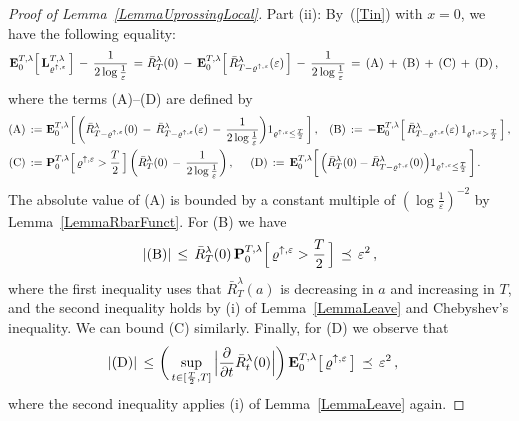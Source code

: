 \documentclass[10pt]{article}
\numberwithin{equation}{section}
\theoremstyle{definition}
\begin{document}
\begin{proof}[Proof of Lemma~\ref{LemmaUprossingLocal}]
\noindent Part (ii): By~(\ref{Tin}) with $x=0$, we have the following equality:
\begin{align*}
 \mathbf{E}^{T,\lambda}_{0}\Big[\,\mathbf{L}^{T,\lambda}_{\varrho^{\uparrow, \varepsilon} }\,\Big] \,-\,\frac{ 1 }{2\log \frac{1}{\varepsilon} }     \,=\,  &\,\bar{R}_{T}^{\lambda}(0) \,-\, \mathbf{E}^{T,\lambda}_{0}\Big[\,\bar{R}_{T-\varrho^{\uparrow,\varepsilon}}^{ \lambda}(\varepsilon)\,\Big]\,-\,\frac{ 1 }{2\log \frac{1}{\varepsilon} }\,=\,\textup{(A)}\,+\, \textup{(B)} \,+\, \textup{(C)}\,+\, \textup{(D)}\,,
 \end{align*}
where the terms (A)--(D) are defined by
\begin{align}
  \textup{(A)}\,:=\,&\, \mathbf{E}^{T,\lambda}_{0}\bigg[\,\bigg( \bar{R}_{T-\varrho^{\uparrow, \varepsilon}}^{\lambda}(0)\,-\, \bar{R}_{T-\varrho^{\uparrow, \varepsilon}}^{\lambda}(\varepsilon)\,-\,\frac{ 1 }{2\log \frac{1}{\varepsilon} }  \bigg) 1_{ \varrho^{\uparrow, \varepsilon}\leq \frac{T}{2} } \, \bigg]\,, \hspace{.3cm} \textup{(B)}\,:=\,- \mathbf{E}^{T,\lambda}_{0}\Big[\,\bar{R}_{T-\varrho^{\uparrow,\varepsilon}}^{ \lambda}(\varepsilon)\,1_{ \varrho^{\uparrow, \varepsilon}> \frac{T}{2}   }\,\Big] \,,\nonumber \\
 \textup{(C)}\,:=\,&\,\mathbf{P}^{T,\lambda}_{0}\Big[\,  \varrho^{\uparrow, \varepsilon} > \frac{T}{2} \,\Big]\,\bigg(\bar{R}_{T}^{\lambda}(0) \,-\,\frac{ 1 }{2\log \frac{1}{\varepsilon} } \bigg)  \,,  \hspace{.5cm} \textup{(D)}\,:=\, \mathbf{E}^{T,\lambda}_{0}\bigg[\,\Big(\bar{R}_{T}^{\lambda}(0) -\bar{R}_{T-\varrho^{\uparrow,\varepsilon}}^{ \lambda}(0)\Big)1_{ \varrho^{\uparrow, \varepsilon}\leq \frac{T}{2}   }\,\bigg]\,.  \nonumber   
\end{align}
The absolute value of (A) is bounded by a constant multiple of $(\log \frac{1}{\varepsilon} )^{-2}$ by Lemma~\ref{LemmaRbarFunct}.  For (B) we have
\begin{align*}
|  \textup{(B)}|\,\leq \,   \bar{R}_{T}^{\lambda}(0) \,\mathbf{P}^{T,\lambda}_{0}\Big[\, \varrho^{\uparrow, \varepsilon}> \frac{T}{2}   \,\Big]\,\preceq\,\varepsilon^2 \,,
\end{align*}
where the first inequality uses that $\bar{R}_{T}^{ \lambda}(a)$ is decreasing in $a$  and increasing in $T$, and the second inequality holds by (i) of Lemma~\ref{LemmaLeave} and  Chebyshev's inequality.   We can bound (C) similarly.  Finally, for (D) we observe that
\begin{align*}
|  \textup{(D)}|\,\leq \, &\, \bigg(\sup_{t\in [\frac{T}{2},T]}\Big| \frac{\partial}{\partial t} \bar{R}_{t}^{\lambda}(0) \Big|\bigg)\, \mathbf{E}^{T,\lambda}_{0}\big[\,\varrho^{\uparrow, \varepsilon}\,\big] \, \preceq\, \varepsilon^2\,,
\end{align*}
where the second inequality applies (i) of Lemma~\ref{LemmaLeave} again.
\end{proof}
\end{document}
